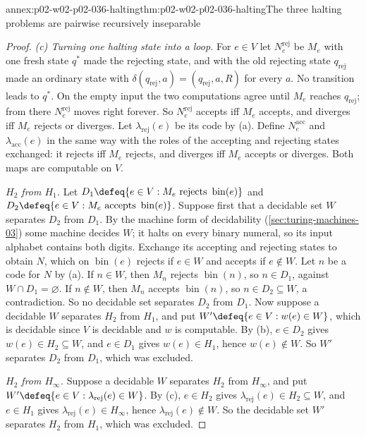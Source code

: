 \begin{annexitem}{annex:p02-w02-p02-036-halting}{thm:p02-w02-p02-036-halting}{The three halting problems are pairwise recursively inseparable}
\begin{proof}
\emph{(c) Turning one halting state into a loop.}  For \(e\in V\) let
\(N^{\mathrm{rej}}_e\) be \(M_e\) with one fresh state \(q^{*}\) made the
rejecting state, and with the old rejecting state \(q_{\mathrm{rej}}\) made an
ordinary state with \(\delta(q_{\mathrm{rej}},a)=(q_{\mathrm{rej}},a,R)\) for
every \(a\).  No transition leads to \(q^{*}\).  On the empty input the two
computations agree until \(M_e\) reaches \(q_{\mathrm{rej}}\); from there
\(N^{\mathrm{rej}}_e\) moves right forever.  So \(N^{\mathrm{rej}}_e\) accepts
iff \(M_e\) accepts, and diverges iff \(M_e\) rejects or diverges.  Let
\(\lambda_{\mathrm{rej}}(e)\) be its code by (a).  Define
\(N^{\mathrm{acc}}_e\) and \(\lambda_{\mathrm{acc}}(e)\) in the same way with
the roles of the accepting and rejecting states exchanged: it rejects iff
\(M_e\) rejects, and diverges iff \(M_e\) accepts or diverges.  Both maps are
computable on \(V\).

\emph{\(H_2\) from \(H_1\).}  Let
\(D_1\defeq\{e\in V:M_e\text{ rejects }\operatorname{bin}(e)\}\) and
\(D_2\defeq\{e\in V:M_e\text{ accepts }\operatorname{bin}(e)\}\).  Suppose
first that a decidable set \(W\) separates \(D_2\) from \(D_1\).  By the machine
form of decidability (\cref{sec:turing-machines-03}) some machine decides
\(W\); it halts on every binary numeral, so its input alphabet contains both
digits.  Exchange its accepting and rejecting states to obtain \(N\), which
on \(\operatorname{bin}(e)\) rejects if \(e\in W\) and accepts if \(e\notin W\).
Let \(n\) be a code for \(N\) by (a).  If \(n\in W\), then \(M_n\) rejects
\(\operatorname{bin}(n)\), so \(n\in D_1\), against \(W\cap D_1=\varnothing\).
If \(n\notin W\), then \(M_n\) accepts \(\operatorname{bin}(n)\), so
\(n\in D_2\subseteq W\), a contradiction.  So no decidable set separates
\(D_2\) from \(D_1\).  Now suppose a decidable \(W\) separates \(H_2\) from
\(H_1\), and put \(W'\defeq\{e\in V:w(e)\in W\}\), which is decidable since
\(V\) is decidable and \(w\) is computable.  By (b), \(e\in D_2\) gives
\(w(e)\in H_2\subseteq W\), and \(e\in D_1\) gives \(w(e)\in H_1\), hence
\(w(e)\notin W\).  So \(W'\) separates \(D_2\) from \(D_1\), which was excluded.

\emph{\(H_2\) from \(H_\infty\).}  Suppose a decidable \(W\) separates \(H_2\)
from \(H_\infty\), and put \(W'\defeq\{e\in V:\lambda_{\mathrm{rej}}(e)\in W\}\).
By (c), \(e\in H_2\) gives \(\lambda_{\mathrm{rej}}(e)\in H_2\subseteq W\), and
\(e\in H_1\) gives \(\lambda_{\mathrm{rej}}(e)\in H_\infty\), hence
\(\lambda_{\mathrm{rej}}(e)\notin W\).  So the decidable set \(W'\) separates
\(H_2\) from \(H_1\), which was excluded.


\end{proof}
\end{annexitem}
